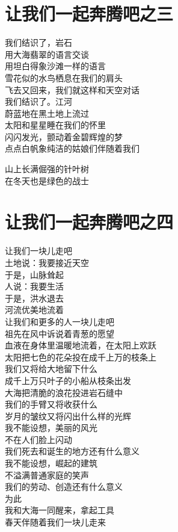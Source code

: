 \documentclass[
]{book}
\renewenvironment{quote}{\begin{VF}}{\end{VF}}
\begin{document}
\hypertarget{section-19}{%
\section{让我们一起奔腾吧之三}\label{section-19}}

\begin{quote}
我们结识了，岩石\\
用大海翡翠的语言交谈\\
用坦白得象沙滩一样的语言\\
雪花似的水鸟栖息在我们的肩头\\
飞去又回来，我们就这样和天空对话\\
我们结识了。江河\\
蔚蓝地在黑土地上流过\\
太阳和星星睡在我们的怀里\\
闪闪发光，颤动着金碧辉煌的梦\\
点点白帆象纯洁的姑娘们伴随着我们

山上长满倔强的针叶树\\
在冬天也是绿色的战士
\end{quote}

\hypertarget{section-20}{%
\section{让我们一起奔腾吧之四}\label{section-20}}

\begin{quote}
让我们一块儿走吧\\
土地说：我要接近天空\\
于是，山脉耸起\\
人说：我要生活\\
于是，洪水退去\\
河流优美地流着\\
让我们和更多的人一块儿走吧\\
祖先在风中诉说着青葱的愿望\\
血液在身体里温暖地流着，在太阳上欢跃\\
太阳把七色的花朵投在成千上万的枝条上\\
我们又将给大地留下什么\\
成千上万只叶子的小船从枝条出发\\
大海把清脆的浪花投进岩石缝中\\
我们的手臂又将收获什么\\
岁月的皱纹又将闪出什么样的光辉\\
我不能设想，美丽的风光\\
不在人们脸上闪动\\
我们死去和诞生的地方还有什么意义\\
我不能设想，崛起的建筑\\
不溢满普通家庭的笑声\\
我们的劳动、创造还有什么意义\\
为此\\
我和大海一同醒来，拿起工具\\
春天伴随着我们一块儿走来
\end{quote}
\end{document}
